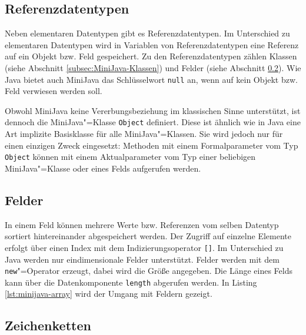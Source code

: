 \pagebreak


\subsection{Referenzdatentypen}

Neben elementaren Datentypen gibt es Referenzdatentypen. Im Unterschied zu elementaren Datentypen wird in Variablen von Referenzdatentypen eine Referenz auf ein Objekt bzw. Feld gespeichert. Zu den Referenzdatentypen zählen Klassen (siehe Abschnitt \ref{subsec:MiniJava-Klassen}) und Felder (siehe Abschnitt \ref{subsec:MiniJava-Felder}). Wie Java bietet auch MiniJava das Schlüsselwort \lstinline{null} an, wenn auf kein Objekt bzw. Feld verwiesen werden soll.

Obwohl MiniJava keine Vererbungsbeziehung im klassischen Sinne unterstützt, ist dennoch die MiniJava"=Klasse \lstinline{Object} definiert. Diese ist ähnlich wie in Java eine Art implizite Basisklasse für alle MiniJava"=Klassen. Sie wird jedoch nur für einen einzigen Zweck eingesetzt: Methoden mit einem Formalparameter vom Typ \lstinline{Object} können mit einem Aktualparameter vom Typ einer beliebigen MiniJava"=Klasse oder eines Felds aufgerufen werden.

\subsection{Felder}
\label{subsec:MiniJava-Felder}

In einem Feld können mehrere Werte bzw. Referenzen vom selben Datentyp sortiert hintereinander abgespeichert werden. Der Zugriff auf einzelne Elemente erfolgt über einen Index mit dem Indizierungsoperator \lstinline{[]}. Im Unterschied zu Java werden nur eindimensionale Felder unterstützt. Felder werden mit dem \lstinline{new}"=Operator erzeugt, dabei wird die Größe angegeben. Die Länge eines Felds kann über die Datenkomponente \lstinline{length} abgerufen werden. In Listing \ref{lst:minijava-array} wird der Umgang mit Feldern gezeigt.



\subsection{Zeichenketten}
\label{subsec:MiniJava-Zeichenketten}

